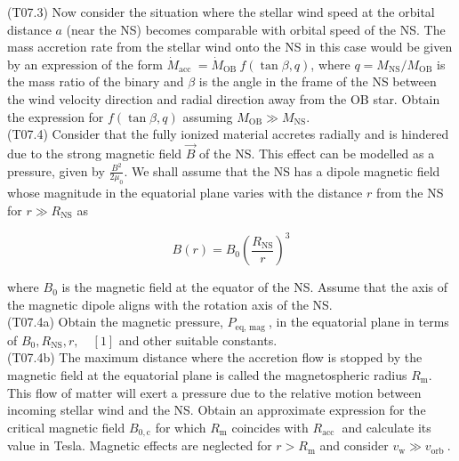 \documentclass[10pt]{article}
\begin{document}
    (T07.3) Now consider the situation where the stellar wind speed at the orbital distance $a$ (near the NS) becomes comparable with orbital speed of the NS. The mass accretion rate from the stellar wind onto the NS in this case would be given by an expression of the form $\dot{M}_{\text {acc }}=\dot{M}_{\text {OB }} f(\tan \beta, q)$, where $q=M_{\mathrm{NS}} / M_{\mathrm{OB}}$ is the mass ratio of the binary and $\beta$ is the angle in the frame of the NS between the wind velocity direction and radial direction away from the OB star. Obtain the expression for $f(\tan \beta, q)$ assuming $M_{\mathrm{OB}} \gg M_{\mathrm{NS}}$.\\
    (T07.4) Consider that the fully ionized material accretes radially and is hindered due to the strong magnetic field $\vec{B}$ of the NS. This effect can be modelled as a pressure, given by $\frac{B^{2}}{2 \mu_{0}}$. We shall assume that the NS has a dipole magnetic field whose magnitude in the equatorial plane varies with the distance $r$ from the NS for $r \gg R_{\mathrm{NS}}$ as
    
    $$
    B(r)=B_{0}\left(\frac{R_{\mathrm{NS}}}{r}\right)^{3}
    $$
    
    where $B_{0}$ is the magnetic field at the equator of the NS. Assume that the axis of the magnetic dipole aligns with the rotation axis of the NS.\\
    (T07.4a) Obtain the magnetic pressure, $P_{\text {eq, mag }}$, in the equatorial plane in terms of $B_{0}, R_{\mathrm{NS}}, r, \quad[1]$ and other suitable constants.\\
    (T07.4b) The maximum distance where the accretion flow is stopped by the magnetic field at the equatorial plane is called the magnetospheric radius $R_{\mathrm{m}}$. This flow of matter will exert a pressure due to the relative motion between incoming stellar wind and the NS. Obtain an approximate expression for the critical magnetic field $B_{0, \mathrm{c}}$ for which $R_{\mathrm{m}}$ coincides with $R_{\text {acc }}$ and calculate its value in Tesla. Magnetic effects are neglected for $r>R_{\mathrm{m}}$ and consider $v_{\mathrm{w}} \gg v_{\text {orb }}$.
\end{document}
